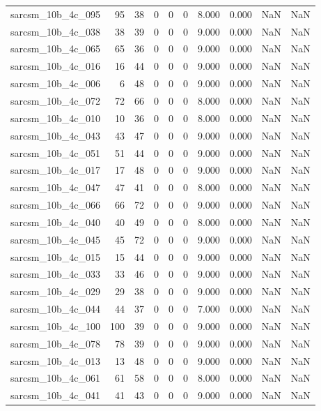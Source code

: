 \documentclass{article}
\begin{document}
\begin{longtable}{lrrrrrrrrr}
sarcsm\_10b\_4c\_095 & 95 & 38 & 0 & 0 & 0 & 8.000 & 0.000 & NaN & NaN \\
sarcsm\_10b\_4c\_038 & 38 & 39 & 0 & 0 & 0 & 9.000 & 0.000 & NaN & NaN \\
sarcsm\_10b\_4c\_065 & 65 & 36 & 0 & 0 & 0 & 9.000 & 0.000 & NaN & NaN \\
sarcsm\_10b\_4c\_016 & 16 & 44 & 0 & 0 & 0 & 9.000 & 0.000 & NaN & NaN \\
sarcsm\_10b\_4c\_006 & 6 & 48 & 0 & 0 & 0 & 9.000 & 0.000 & NaN & NaN \\
sarcsm\_10b\_4c\_072 & 72 & 66 & 0 & 0 & 0 & 8.000 & 0.000 & NaN & NaN \\
sarcsm\_10b\_4c\_010 & 10 & 36 & 0 & 0 & 0 & 8.000 & 0.000 & NaN & NaN \\
sarcsm\_10b\_4c\_043 & 43 & 47 & 0 & 0 & 0 & 9.000 & 0.000 & NaN & NaN \\
sarcsm\_10b\_4c\_051 & 51 & 44 & 0 & 0 & 0 & 9.000 & 0.000 & NaN & NaN \\
sarcsm\_10b\_4c\_017 & 17 & 48 & 0 & 0 & 0 & 9.000 & 0.000 & NaN & NaN \\
sarcsm\_10b\_4c\_047 & 47 & 41 & 0 & 0 & 0 & 8.000 & 0.000 & NaN & NaN \\
sarcsm\_10b\_4c\_066 & 66 & 72 & 0 & 0 & 0 & 9.000 & 0.000 & NaN & NaN \\
sarcsm\_10b\_4c\_040 & 40 & 49 & 0 & 0 & 0 & 8.000 & 0.000 & NaN & NaN \\
sarcsm\_10b\_4c\_045 & 45 & 72 & 0 & 0 & 0 & 9.000 & 0.000 & NaN & NaN \\
sarcsm\_10b\_4c\_015 & 15 & 44 & 0 & 0 & 0 & 9.000 & 0.000 & NaN & NaN \\
sarcsm\_10b\_4c\_033 & 33 & 46 & 0 & 0 & 0 & 9.000 & 0.000 & NaN & NaN \\
sarcsm\_10b\_4c\_029 & 29 & 38 & 0 & 0 & 0 & 9.000 & 0.000 & NaN & NaN \\
sarcsm\_10b\_4c\_044 & 44 & 37 & 0 & 0 & 0 & 7.000 & 0.000 & NaN & NaN \\
sarcsm\_10b\_4c\_100 & 100 & 39 & 0 & 0 & 0 & 9.000 & 0.000 & NaN & NaN \\
sarcsm\_10b\_4c\_078 & 78 & 39 & 0 & 0 & 0 & 9.000 & 0.000 & NaN & NaN \\
sarcsm\_10b\_4c\_013 & 13 & 48 & 0 & 0 & 0 & 9.000 & 0.000 & NaN & NaN \\
sarcsm\_10b\_4c\_061 & 61 & 58 & 0 & 0 & 0 & 8.000 & 0.000 & NaN & NaN \\
sarcsm\_10b\_4c\_041 & 41 & 43 & 0 & 0 & 0 & 9.000 & 0.000 & NaN & NaN \\

\end{longtable}
\end{document}

